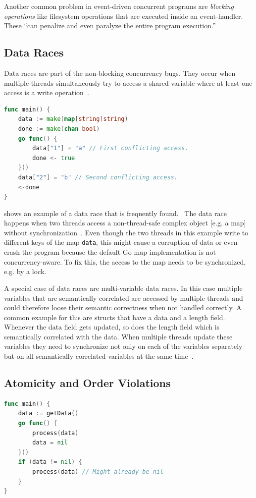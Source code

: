 \documentclass[conference]{IEEEtran}
\begin{document}
Another common problem in event-driven concurrent programs are \emph{blocking operations} like filesystem operations that are executed inside an event-handler.
These ``can penalize and even paralyze the entire program execution.''~\cite{tchamgoue2012testing}

\subsection{Data Races}

Data races are part of the non-blocking concurrency bugs.
They occur when multiple threads simultaneously try to access a shared variable where at least one access is a write operation~\cite{serebry2009threadsanitizer}.

\begin{lstlisting}[float=h, language=Go, label=lst:race, caption=Data race by concurrently accessing a map]
func main() {
	data := make(map[string]string)
	done := make(chan bool)
	go func() {
		data["1"] = "a" // First conflicting access.
		done <- true
	}()
	data["2"] = "b" // Second conflicting access.
	<-done
}
\end{lstlisting}

 shows an example of a data race that is frequently found.~\cite{serebry2009threadsanitizer}
The data race happens when two threads access a non-thread-safe complex object [e.g. a map] without synchronization~\cite{serebry2009threadsanitizer}.
Even though the two threads in this example write to different keys of the map \lstinline{data}, this might cause a corruption of data or even crash the program because the default Go map implementation is not concurrency-aware.
To fix this, the access to the map needs to be synchronized, e.g. by a lock.

A special case of data races are multi-variable data races.
In this case multiple variables that are semantically correlated are accessed by multiple threads and could therefore loose their semantic correctness when not handled correctly.
A common example for this are structs that have a data and a length field.
Whenever the data field gets updated, so does the length field which is semantically correlated with the data.
When multiple threads update these variables they need to synchronize not only on each of the variables separately but on all semantically correlated variables at the same time~\cite{lu2007muvi}.

\subsection{Atomicity and Order Violations}
\begin{lstlisting}[float=h, language=Go, label=lst:order, caption=Test-and-Use bug pattern -- Order violation]
func main() {
    data := getData()
    go func() {
        process(data)
        data = nil
    }()
    if (data != nil) {
        process(data) // Might already be nil
    }
}
\end{lstlisting}
\end{document}
